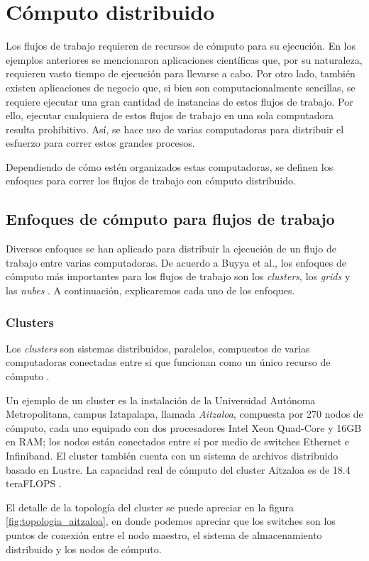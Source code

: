 \chapter{Cómputo distribuido}
Los flujos de trabajo requieren de recursos de cómputo para su ejecución. En los ejemplos anteriores se mencionaron aplicaciones científicas que, por su naturaleza, requieren vasto tiempo de ejecución para llevarse a cabo. Por otro lado, también existen aplicaciones de negocio que, si bien son computacionalmente sencillas, se requiere ejecutar una gran cantidad de instancias de estos flujos de trabajo. Por ello, ejecutar cualquiera de estos flujos de trabajo en una sola computadora resulta prohibitivo. Así, se hace uso de varias computadoras para distribuir el esfuerzo para correr estos grandes procesos.

Dependiendo de cómo estén organizados estas computadoras, se definen los enfoques para correr los flujos de trabajo con cómputo distribuido.

\section{Enfoques de cómputo para flujos de trabajo}
Diversos enfoques se han aplicado para distribuir la ejecución de un flujo de trabajo entre varias computadoras.  De acuerdo a Buyya et al., los enfoques de cómputo más importantes para los flujos de trabajo son los \emph{clusters}, los \emph{grids} y las \emph{nubes} \cite{buyya2009cloud}. A continuación, explicaremos cada uno de los enfoques.

\subsection{Clusters}
Los \emph{clusters} son sistemas distribuidos, paralelos, compuestos de varias computadoras conectadas entre si que funcionan como un único recurso de cómputo \cite{buyya2009cloud}. 

Un ejemplo de un cluster es la instalación de la Universidad Autónoma Metropolitana, campus Iztapalapa, llamada \emph{Aitzaloa}, compuesta por 270 nodos de cómputo, cada uno equipado con dos procesadores Intel Xeon Quad-Core y 16GB en RAM; los nodos están conectados entre sí por medio de switches Ethernet e Infiniband. El cluster también cuenta con un sistema de archivos distribuido basado en Lustre. La capacidad real de cómputo del cluster Aitzaloa es de 18.4 teraFLOPS \cite{uamz2013tizaloa}.

El detalle de la topología del cluster se puede apreciar en la figura \ref{fig:topologia_aitzaloa}, en donde podemos apreciar que los switches son los puntos de conexión entre el nodo maestro, el sistema de almacenamiento distribuido y los nodos de cómputo.

